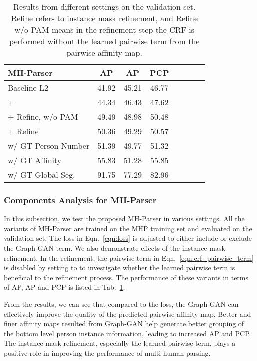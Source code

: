 \documentclass[10pt, letterpaper]{article}
\begin{document}
\begin{table}
  \centering
    \caption{Results from different settings on the validation set. Refine refers to instance mask refinement, and Refine w/o PAM means in the refinement step the CRF is performed without the learned pairwise term from the pairwise affinity map.} \label{tab:ablation_val}
\vspace{2mm}
  \begin{tabular}{lccccccc}
    \toprule
MH-Parser 	& AP  &   AP & PCP\\
    \midrule
Baseline L2 & 41.92 & 45.21 & 46.77 \\
\hspace{2mm}+  & 44.34 & 46.43 & 47.62 \\
\hspace{2mm}+ Refine, w/o PAM &   49.49 & 48.98 & 50.48 \\ 
\hspace{2mm}+ Refine &   50.36 & 49.29 & 50.57 \\ 
\midrule
\hspace{2mm}w/ GT Person Number&     51.39 & 49.77 & 51.32  \\ 
\hspace{2mm}w/ GT Affinity &     55.83 & 51.28 & 55.85  \\ 
\hspace{2mm}w/ GT Global Seg. &      91.75 & 77.29 & 82.96  \\ 
    \bottomrule
  \end{tabular}
\end{table}

\subsubsection{Components Analysis for MH-Parser}

In this subsection, we test the proposed MH-Parser in various settings. All the variants of MH-Parser are trained on the MHP training set and evaluated on the validation set. The loss in Eqn.~\eqref{eqn:loss} is adjusted to either include or exclude the Graph-GAN term. We also demonstrate effects of the instance mask refinement. In the refinement, the pairwise term in Eqn.~\eqref{eqn:crf_pairwise_term} is disabled by setting  to  to investigate whether the learned pairwise term is beneficial to the refinement process. The performance of these variants in terms of AP, AP and PCP is listed in Tab.~\ref{tab:ablation_val}. 

From the results, we can see that compared to the  loss, the Graph-GAN can effectively improve the quality of the predicted pairwise affinity map. Better and finer affinity maps resulted from Graph-GAN help generate better grouping of the bottom level person instance information, leading to increased AP and PCP. The instance mask refinement, especially the learned pairwise term, plays a positive role in improving the performance of multi-human parsing.
\end{document}
